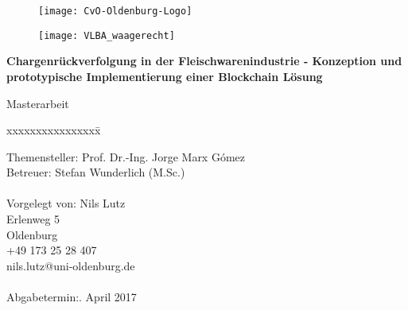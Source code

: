 \begin{titlepage}
  \begin{centering}
  \begin{figure}[h!]
    \centering
    \texttt{[image: CvO-Oldenburg-Logo]}    %
  \end{figure}

  \vspace*{-0.8cm}

  \begin{figure}[h!]
    \centering
    \texttt{[image: VLBA\_waagerecht]}    %
  \end{figure}

  \vspace*{0.4cm}

  \textsf{\Huge \textbf{Chargenrückverfolgung in der Fleischwarenindustrie - Konzeption und prototypische Implementierung einer Blockchain Lösung\\}}

  \vspace*{0.5cm}
  \noindent Masterarbeit\\

  \end{centering}

  \vspace*{1.5cm}
  \begin{tabbing}
  xxxxxxxxxxxxxxxx\= \kill

  \small Themensteller:\> Prof. Dr.-Ing. Jorge Marx Gómez\\
  \small Betreuer:\> Stefan Wunderlich (M.Sc.)\\\\

  \small Vorgelegt von: \>Nils Lutz\\
  \small \>Erlenweg 5\\
  \small {} Oldenburg\\
  \small \>+49 173 25 28 407\\
  \small \>nils.lutz@uni-oldenburg.de\\\\

  \small Abgabetermin:. April 2017
  \end{tabbing}
\end{titlepage}
\newpage
